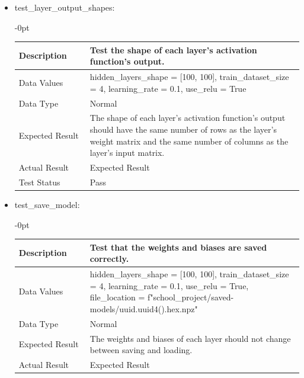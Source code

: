 \documentclass[./project-report/src/latex/project-report.tex]{subfiles}
\begin{document}
\begin{itemize}
\begin{itemize}
\begin{itemize}
					\vspace{5mm}

					\item test\_layer\_output\_shapes: \newline
					\begin{adjustwidth}{-\leftmargin}{0pt}
					\begin{tabular}{|p{0.25\linewidth}|p{0.75\linewidth}|}
						\hline
						Description & Test the shape of each layer's activation function's output. \\
						\hline
						Data Values & hidden\_layers\_shape = [100, 100], \newline
                         	train\_dataset\_size = 4, \newline
                         	learning\_rate = 0.1, \newline
                         	use\_relu = True \\
						\hline
						Data Type & Normal \\
						\hline
						Expected Result & The shape of each layer's activation function's output should have the same number of rows as the layer's weight matrix and the same number of columns as the layer's input matrix. \\
						\hline
						Actual Result & Expected Result \\
						\hline
						Test Status & Pass \\
						\hline
					\end{tabular}
					\end{adjustwidth}

					\vspace{5mm}

					\item test\_save\_model: \newline
					\begin{adjustwidth}{-\leftmargin}{0pt}
					\begin{tabular}{|p{0.25\linewidth}|p{0.75\linewidth}|}
						\hline
						Description & Test that the weights and biases are saved correctly. \\
						\hline
						Data Values & hidden\_layers\_shape = [100, 100], \newline
                            train\_dataset\_size = 4, \newline
                            learning\_rate = 0.1, \newline
                            use\_relu = True, \newline
							file\_location = f"school\_project/saved-models/{uuid.uuid4().hex}.npz" \\
						\hline
						Data Type & Normal \\
						\hline
						Expected Result & The weights and biases of each layer should not change between saving and loading. \\
						\hline
						Actual Result & Expected Result \\
						\hline
					\end{tabular}
					\end{adjustwidth}


\end{itemize}
\end{itemize}
\end{itemize}
\end{document}
